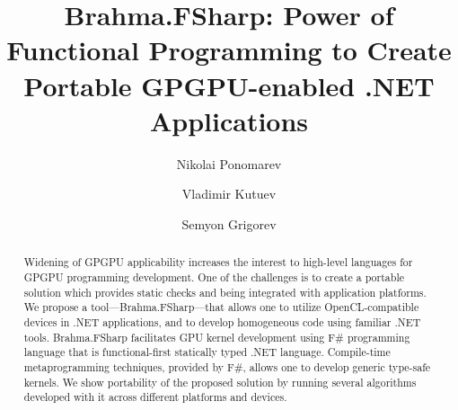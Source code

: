 \documentclass[runningheads]{llncs}
\begin{document}
%
\title{Brahma.FSharp: Power of Functional Programming to Create Portable GPGPU-enabled .NET Applications}
%
%
\author{Nikolai Ponomarev \and
Vladimir Kutuev \and
Semyon Grigorev}
%
%
%
\maketitle              %
%
\begin{abstract}
Widening of GPGPU applicability increases the interest to high-level languages for GPGPU programming development.
One of the challenges is to create a portable solution which provides static checks and being integrated with application platforms.
We propose a tool---Brahma.FSharp---that allows one to utilize OpenCL-compatible devices in .NET applications, and to develop homogeneous code using familiar .NET tools.
Brahma.FSharp facilitates GPU kernel development using F\# programming language that is functional-first statically typed .NET language.
Compile-time metaprogramming techniques, provided by F\#, allows one to develop generic type-safe kernels.
We show portability of the proposed solution by running several algorithms developed with it across different platforms and devices.
    
\end{abstract}


%







\end{document}
